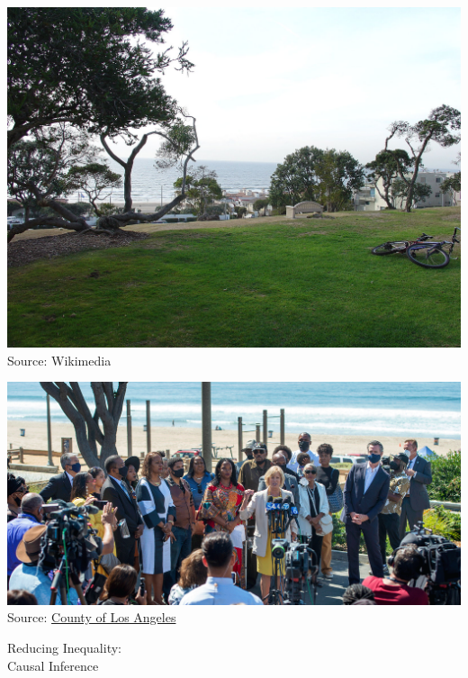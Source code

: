 \documentclass{beamer}
\begin{document}
\begin{frame}
\includegraphics[width = \textwidth]{figures/park}\\
Source: Wikimedia
\end{frame}

\begin{frame}
\includegraphics[width = \textwidth]{figures/reparation} \\
Source: \href{https://ceo.lacounty.gov/ardi/bruces-beach/}{County of Los Angeles}
\end{frame}

\begin{frame}
\huge Reducing Inequality:\\Causal Inference
\end{frame}
\end{document}
